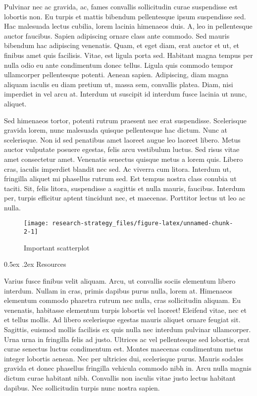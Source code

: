 \documentclass[11pt,]{article}
\makeatletter
\renewcommand\subsubsection{
  \@startsection{subsubsection}{3}{\z@}
    {-1.0ex\@plus -1ex \@minus -.2ex}%
    {0.5ex \@plus .2ex}%
    {\normalfont\normalsize\bf}} %
\makeatother
\begin{document}
Pulvinar nec ac gravida, ac, fames convallis sollicitudin curae
suspendisse est lobortis non. Eu turpis et mattis bibendum pellentesque
ipsum suspendisse sed. Hac malesuada lectus cubilia, lorem lacinia
himenaeos duis. A, leo in pellentesque auctor faucibus. Sapien
adipiscing ornare class ante commodo. Sed mauris bibendum hac adipiscing
venenatis. Quam, et eget diam, erat auctor et ut, et finibus amet quis
facilisis. Vitae, est ligula porta sed. Habitant magna tempus per nulla
odio eu ante condimentum donec tellus. Ligula quis commodo tempor
ullamcorper pellentesque potenti. Aenean sapien. Adipiscing, diam magna
aliquam iaculis eu diam pretium ut, massa sem, convallis platea. Diam,
nisi imperdiet in vel arcu at. Interdum ut suscipit id interdum fusce
lacinia ut nunc, aliquet.

Sed himenaeos tortor, potenti rutrum praesent nec erat suspendisse.
Scelerisque gravida lorem, nunc malesuada quisque pellentesque hac
dictum. Nunc at scelerisque. Non id sed penatibus amet laoreet augue leo
laoreet libero. Metus auctor vulputate posuere egestas, felis arcu
vestibulum luctus. Sed risus vitae amet consectetur amet. Venenatis
senectus quisque metus a lorem quis. Libero cras, iaculis imperdiet
blandit nec sed. Ac viverra cum litora. Interdum ut, fringilla aliquet
mi phasellus rutrum sed. Est tempus nostra class conubia ut taciti. Sit,
felis litora, suspendisse a sagittis et nulla mauris, faucibus. Interdum
per, turpis efficitur aptent tincidunt nec, et maecenas. Porttitor
lectus ut leo ac nulla.

\begin{wrapfigure}{R}{0.3\textwidth}

\hfill{}\texttt{[image: research-strategy\_files/figure-latex/unnamed-chunk-2-1]} 

\caption{Important scatterplot}\label{fig:unnamed-chunk-2}
\end{wrapfigure}

\hypertarget{resources}{%
\subsubsection{Resources}\label{resources}}

Varius fusce finibus velit aliquam. Arcu, ut convallis sociis elementum
libero interdum. Nullam in cras, primis dapibus purus nulla, lorem at.
Himenaeos elementum commodo pharetra rutrum nec nulla, cras sollicitudin
aliquam. Eu venenatis, habitasse elementum turpis lobortis vel laoreet!
Eleifend vitae, nec et et tellus mollis. Ad libero scelerisque egestas
mauris aliquet ornare feugiat sit. Sagittis, euismod mollis facilisis ex
quis nulla nec interdum pulvinar ullamcorper. Urna urna in fringilla
felis ad justo. Ultrices ac vel pellentesque sed lobortis, erat curae
senectus luctus condimentum est. Montes maecenas condimentum metus
integer lobortis aenean. Nec per ultricies dui, scelerisque purus.
Mauris sodales gravida et donec phasellus fringilla vehicula commodo
nibh in. Arcu nulla magnis dictum curae habitant nibh. Convallis non
iaculis vitae justo lectus habitant dapibus. Nec sollicitudin turpis
nunc nostra sapien.
\end{document}
